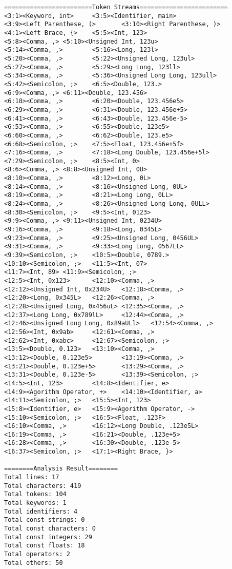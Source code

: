 \documentclass[lang=cn,11pt,a4paper]{paper}
\begin{document}
\begin{lstlisting}
========================Token Streams========================
<3:1><Keyword, int>     <3:5><Identifier, main>
<3:9><Left Parenthese, (>       <3:10><Right Parenthese, )>
<4:1><Left Brace, {>    <5:5><Int, 123>
<5:8><Comma, ,> <5:10><Unsigned Int, 123u>
<5:14><Comma, ,>        <5:16><Long, 123l>
<5:20><Comma, ,>        <5:22><Unsigned Long, 123ul>
<5:27><Comma, ,>        <5:29><Long Long, 123ll>
<5:34><Comma, ,>        <5:36><Unsigned Long Long, 123ull>
<5:42><Semicolon, ;>    <6:5><Double, 123.>
<6:9><Comma, ,> <6:11><Double, 123.456>
<6:18><Comma, ,>        <6:20><Double, 123.456e5>
<6:29><Comma, ,>        <6:31><Double, 123.456e+5>
<6:41><Comma, ,>        <6:43><Double, 123.456e-5>
<6:53><Comma, ,>        <6:55><Double, 123e5>
<6:60><Comma, ,>        <6:62><Double, 123.e5>
<6:68><Semicolon, ;>    <7:5><Float, 123.456e+5f>
<7:16><Comma, ,>        <7:18><Long Double, 123.456e+5l>
<7:29><Semicolon, ;>    <8:5><Int, 0>
<8:6><Comma, ,> <8:8><Unsigned Int, 0U>
<8:10><Comma, ,>        <8:12><Long, 0L>
<8:14><Comma, ,>        <8:16><Unsigned Long, 0UL>
<8:19><Comma, ,>        <8:21><Long Long, 0LL>
<8:24><Comma, ,>        <8:26><Unsigned Long Long, 0ULL>
<8:30><Semicolon, ;>    <9:5><Int, 0123>
<9:9><Comma, ,> <9:11><Unsigned Int, 0234U>
<9:16><Comma, ,>        <9:18><Long, 0345L>
<9:23><Comma, ,>        <9:25><Unsigned Long, 0456UL>
<9:31><Comma, ,>        <9:33><Long Long, 0567LL>
<9:39><Semicolon, ;>    <10:5><Double, 0789.>
<10:10><Semicolon, ;>   <11:5><Int, 07>
<11:7><Int, 89> <11:9><Semicolon, ;>
<12:5><Int, 0x123>      <12:10><Comma, ,>
<12:12><Unsigned Int, 0x234U>   <12:18><Comma, ,>
<12:20><Long, 0x345L>   <12:26><Comma, ,>
<12:28><Unsigned Long, 0x456uL> <12:35><Comma, ,>
<12:37><Long Long, 0x789lL>     <12:44><Comma, ,>
<12:46><Unsigned Long Long, 0x89aULl>   <12:54><Comma, ,>
<12:56><Int, 0x9ab>     <12:61><Comma, ,>
<12:62><Int, 0xabc>     <12:67><Semicolon, ;>
<13:5><Double, 0.123>   <13:10><Comma, ,>
<13:12><Double, 0.123e5>        <13:19><Comma, ,>
<13:21><Double, 0.123e+5>       <13:29><Comma, ,>
<13:31><Double, 0.123e-5>       <13:39><Semicolon, ;>
<14:5><Int, 123>        <14:8><Identifier, e>
<14:9><Agorithm Operator, +>    <14:10><Identifier, a>
<14:11><Semicolon, ;>   <15:5><Int, 123>
<15:8><Identifier, e>   <15:9><Agorithm Operator, ->
<15:10><Semicolon, ;>   <16:5><Float, .123F>
<16:10><Comma, ,>       <16:12><Long Double, .123e5L>
<16:19><Comma, ,>       <16:21><Double, .123e+5>
<16:28><Comma, ,>       <16:30><Double, .123e-5>
<16:37><Semicolon, ;>   <17:1><Right Brace, }>

========Analysis Result========
Total lines: 17
Total characters: 419
Total tokens: 104
Total keywords: 1
Total identifiers: 4
Total const strings: 0
Total const characters: 0
Total const integers: 29
Total const floats: 18
Total operators: 2
Total others: 50
\end{lstlisting}
\end{document}
